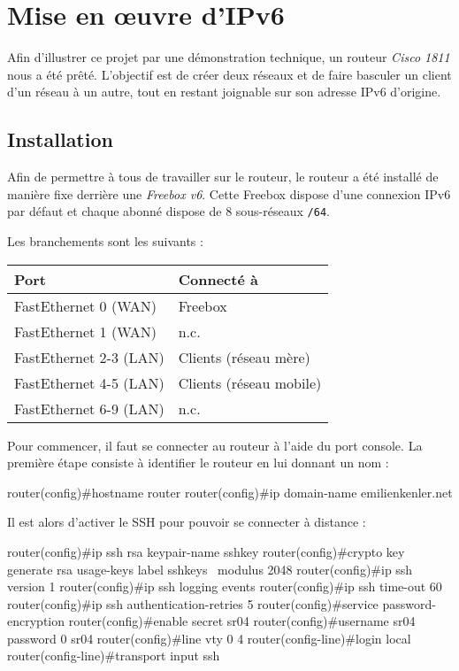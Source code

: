 \section{Mise en œuvre d'IPv6}

Afin d'illustrer ce projet par une démonstration technique, un routeur \emph{Cisco 1811} nous a été prêté. L'objectif est de créer deux réseaux et de faire basculer un client d'un réseau à un autre, tout en restant joignable sur son adresse IPv6 d'origine.

\subsection{Installation}

Afin de permettre à tous de travailler sur le routeur, le routeur a été installé de manière fixe derrière une \emph{Freebox v6}.
Cette Freebox dispose d'une connexion IPv6 par défaut et chaque abonné dispose de 8 sous-réseaux \texttt{/64}.

Les branchements sont les suivants :
\begin{center}
    \begin{tabular}{|l|l|}
    \hline
    Port                   & Connecté à \\ \hline
    FastEthernet 0 (WAN)   & Freebox    \\ \hline
    FastEthernet 1 (WAN)   & n.c.       \\ \hline
    FastEthernet 2-3 (LAN) & Clients (réseau mère)   \\ \hline
    FastEthernet 4-5 (LAN) & Clients (réseau mobile)   \\ \hline
    FastEthernet 6-9 (LAN) & n.c.   \\ \hline
    \end{tabular}
\end{center}

Pour commencer, il faut se connecter au routeur à l'aide du port console.
La première étape consiste à identifier le routeur en lui donnant un nom :

\begin{code}
router(config)#hostname router
router(config)#ip domain-name emilienkenler.net
\end{code}

Il est alors d'activer le SSH pour pouvoir se connecter à distance :

\begin{code}
router(config)#ip ssh rsa keypair-name sshkey
router(config)#crypto key generate rsa usage-keys label sshkeys \
               modulus 2048
router(config)#ip ssh version 1
router(config)#ip ssh logging events
router(config)#ip ssh time-out 60
router(config)#ip ssh authentication-retries 5
router(config)#service password-encryption
router(config)#enable secret sr04
router(config)#username sr04 password 0 sr04
router(config)#line vty 0 4
router(config-line)#login local
router(config-line)#transport input ssh
\end{code}

